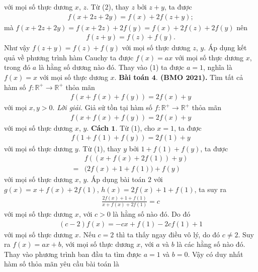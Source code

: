 \begin{multicols}{2}
	với mọi số thực dương $x$,  $z$.
	Từ ($2$), thay $z$ bởi $z+y$, ta được
	\begin{align*}
		f\left( {x + 2z + 2y} \right) = f(x) + 2f(z + y);
	\end{align*}
	mà 
	$f\left( {x + 2z + 2y} \right)=f(x + 2z) + 2f(y) =f(x) + 2f(z) + 2f(y)$ nên 
	\begin{align*}
		f(z + y) = f(z) + f(y).
	\end{align*}
	Như vậy $f(z + y) = f(z) + f(y)$ với mọi số thực dương $z$, $y$. Áp dụng kết quả về phương trình hàm Cauchy ta được
	$f(x) = ax$ với mọi số thực dương $x$,  trong đó $a$ là hằng số dương nào đó. Thay vào ($1$) ta được $a=1$, nghĩa là $f(x)= x$ với mọi số thực dương $x$.
	\vskip 0.1cm
	\textbf{\color{hoccungpi}Bài toán $\pmb{4.}$ (BMO $\pmb{2021}$).}
	Tìm tất cả hàm số $f: \mathbb{R}^{+} \rightarrow \mathbb{R}^{+}$ thỏa mãn
	\begin{align*}
		f(x+f(x)+f(y))=2 f(x)+y
	\end{align*}
	với mọi $x, y>0$.
	\vskip 0.1cm
	\textit{Lời giải.}
	Giả sử tồn tại hàm số 
	$f: \mathbb{R}^{+} \rightarrow \mathbb{R}^{+}$ thỏa mãn 
	\begin{align*}
		f(x+f(x)+f(y))=2 f(x)+y \tag{$1$}
	\end{align*}
	với mọi số thực dương $x$, $y$.
	\vskip 0.1cm
	\textbf{\color{hoccungpi}Cách $\pmb{1.}$}
	Từ ($1$), cho $x=1$, ta được
	\begin{align*}
		f(1+f(1)+f(y))=2 f(1)+y
	\end{align*}
	với mọi số thực dương  $y$. 
	Từ ($1$), thay $y$ bởi $ 1+f(1)+f(y)$, ta được
	\begin{align*}
		&f((x+f(x)+2 f(1))+y)\\
		=&\big(2 f(x)+1+f(1)\big)+f(y)
	\end{align*}
	với mọi số thực dương $x$, $y$.
	Áp dụng bài toán $2$ với $g(x)=x+f(x)+2 f(1)$, $h(x)=2 f(x)+1+f(1)$, ta suy ra
	\begin{align*}
		\frac{2 f(x)+1+f(1)}{x+f(x)+2 f(1)}=c
	\end{align*}
	với mọi số thực dương $x$, với  $ c>0$  là hằng số nào đó.
	Do đó
	\begin{align*}
		(c-2) f(x)=-c x+f(1)-2 c f(1)+1
	\end{align*}
	với mọi số thực dương $x$.
	Nếu $c=2$ thì ta thấy ngay điều vô lý, do đó $c \neq 2$. Suy ra $f(x)=a x+b$, với mọi số thực dương $x$, với $a$ và $b$ là các hằng số nào đó.
	Thay vào phương trình ban đầu ta tìm được $a=1$ và $b=0$.
	Vậy có duy nhất hàm số thỏa mãn yêu cầu bài toán là

\end{multicols}
